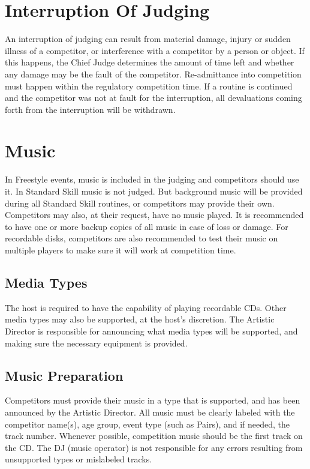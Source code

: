 \section{Interruption Of Judging}
An interruption of judging can result from material damage, injury or sudden illness of a competitor, or interference with a competitor by a person or object.
If this happens, the Chief Judge determines the amount of time left and whether any damage may be the fault of the competitor.
Re-admittance into competition must happen within the regulatory competition time.
If a routine is continued and the competitor was not at fault for the interruption, all devaluations coming forth from the interruption will be withdrawn.

\section{Music \label{sec:freestyle_music}}
In Freestyle events, music is included in the judging and competitors should use it.
In Standard Skill music is not judged.
But background music will be provided during all Standard Skill routines, or competitors may provide their own.
Competitors may also, at their request, have no music played.
It is recommended to have one or more backup copies of all music in case of loss or damage.
For recordable disks, competitors are also recommended to test their music on multiple players to make sure it will work at competition time.

\subsection{Media Types}
The host is required to have the capability of playing recordable CDs.
Other media types may also be supported, at the host's discretion.
The Artistic Director is responsible for announcing what media types will be supported, and making sure the necessary equipment is provided.

\subsection{Music Preparation}
Competitors must provide their music in a type that is supported, and has been announced by the Artistic Director.
All music must be clearly labeled with the competitor name(s), age group, event type (such as Pairs), and if needed, the track number.
Whenever possible, competition music should be the first track on the CD.
The DJ (music operator) is not responsible for any errors resulting from unsupported types or mislabeled tracks.

